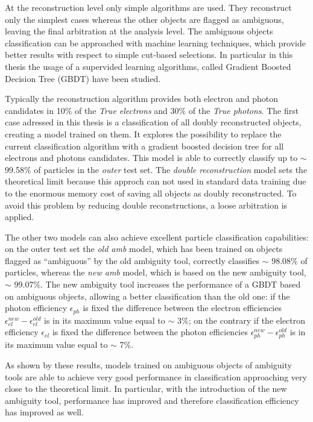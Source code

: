 \documentclass[a4paper, oneside, 11pt]{book}
\begin{document}
	At the reconstruction level only simple algorithms are used. They reconstruct only the simplest cases whereas the other objects are flagged as ambiguous, leaving the final arbitration at the analysis level. The ambiguous objects classification can be approached with machine learning techniques, which provide better results with respect to simple cut-based selections. In particular in this thesis the usage of a supervided learning algorithms, called Gradient Boosted  Decision Tree (GBDT) have been studied.
	
	Typically the reconstruction algorithm provides both electron and photon candidates in 10\% of the \textit{True electrons} and 30\% of the \textit{True photons}. The first case adressed in this thesis is a classification of all doubly reconstructed objects, creating a model trained on them. It explores the possibility to replace the current classification algorithm with a gradient boosted decision tree for all electrons and photons candidates. This model is able to correctly classify up to $\sim$ 99.58\% of particles in the \textit{outer} test set. The \textit{double reconstruction} model sets the theoretical limit because this approch can not used in standard data training due to the enormous memory cost of saving all objects as doubly reconstructed. To avoid this problem by reducing double reconstructions, a loose arbitration is applied.
	
	
	
	
	The other two models can also achieve excellent particle classification capabilities: on the outer test set the \textit{old amb} model, which has been trained on objects flagged as “ambiguous” by the old ambiguity tool, correctly classifies $\sim$ 98.08\% of particles, whereas the \textit{new amb} model,  which is based on the new ambiguity tool, $\sim$ 99.07\%. The new ambiguity tool  increases the performance of a GBDT based on ambiguous objects, allowing a better classification than the old one: if the photon efficiency $\epsilon_{ph}$ is fixed the difference between the electron efficiencies $\epsilon_{el}^{new} - \epsilon_{el}^{old}$ is in its maximum value equal to $\sim$ 3\%; on the contrary if the electron efficiency $\epsilon_{el}$ is fixed the difference between the photon efficiencies $\epsilon_{ph}^{new} - \epsilon_{ph}^{old}$ is in its maximum value equal to $\sim$ 7\%.

	As shown by these results, models trained on ambiguous objects of ambiguity tools are able to achieve very good performance in classification approaching very close to the theoretical limit. In particular, with the introduction of the new ambiguity tool, performance has improved and therefore classification efficiency has improved as well.
	
\end{document}
